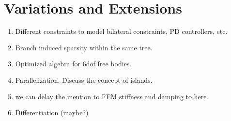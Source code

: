 \section{Variations and Extensions}
\label{sec:variations_and_extensions}

\begin{enumerate}
    \item Different constraints to model bilateral constraints, PD controllers, etc.
    \item Branch induced sparsity within the same tree.
    \item Optimized algebra for 6dof free bodies.
    \item Parallelization. Discuss the concept of islands.
    \item we can delay the mention to FEM stiffness and damping to here.
    \item Differentiation (maybe?)    
\end{enumerate}